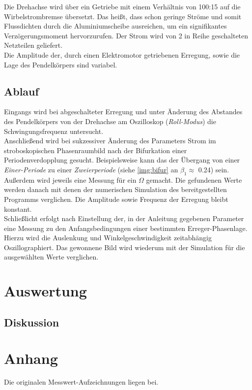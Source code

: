 \documentclass[numbers=noenddot,12pt,a4paper]{scrartcl}
\newcommand{\tilt}[1]{\textit{#1}}
\begin{document}
Die Drehachse wird über ein Getriebe mit einem Verhältnis von 100:15 auf die Wirbelstrombremse übersetzt. Das heißt, dass schon geringe Ströme und somit Flussdichten durch die Aluminiumscheibe ausreichen, um ein signifikantes Verzögerungsmoment hervorzurufen. Der Strom wird von 2 in Reihe geschalteten Netzteilen geliefert.\\
Die Amplitude der, durch einen Elektromotor getriebenen Erregung, sowie die Lage des Pendelkörpers sind variabel. 
\subsection{Ablauf}
Eingangs wird bei abgeschalteter Erregung und unter Änderung des Abstandes des Pendelkörpers von der Drehachse am Oszilloskop (\tilt{Roll-Modus}) die  Schwingungsfrequenz untersucht.\\
Anschließend wird bei sukzessiver Änderung des Parameters Strom im stroboskopischen Phasenraumbild nach der Bifurkation einer Periodenverdopplung gesucht. Beispielsweise kann das der Übergang von einer \tilt{Einer-Periode} zu einer  \tilt{Zweierperiode} (siehe \ref{img:bifur} an $\beta_1\approx$ 0.24) sein. Außerdem wird jeweils eine Messung für ein $\Omega$ gemacht. Die gefundenen Werte werden danach mit denen der numerischen Simulation des bereitgestellten Programms verglichen. Die Amplitude sowie Frequenz der Erregung bleibt konstant.\\
Schließlicht erfolgt nach Einstellung der, in der Anleitung gegebenen Parameter eine Messung zu den Anfangsbedingungen einer bestimmten Erreger-Phasenlage. Hierzu wird die Auslenkung und Winkelgeschwindigkeit zeitabhängig Oszillographiert. Das gewonnene Bild wird wiederum mit der Simulation für die ausgewählten Werte verglichen.
\section{Auswertung}
\subsection{Diskussion}
\section{Anhang}
Die originalen Messwert-Aufzeichnungen liegen bei.
\end{document}
